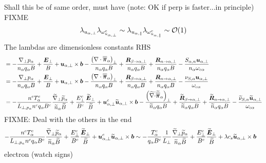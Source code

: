 Shall this be of same order, must have (note: OK if perp is faster...in principle)
FIXME
%
\begin{align*}
 \lambda_{u_{\alpha,\perp}}
 \lambda_{\omega^c_{u_{\alpha,\perp}}}
 \sim
 \lambda_{u_{\alpha,\|}}
 \lambda_{\omega^c_{u_{\alpha,\|}}}
 \sim
 \mathcal{O}(1)
\end{align*}
%
The lambdas are dimensionless constants
%
RHS
%
\begin{align*}
&=
- \frac{ \nabla_\perp p_\alpha }{n_\alpha  q_\alpha B}
+ \frac{\boldsymbol{E}_\perp}{B}
+ \boldsymbol{u}_{\alpha,\perp}\times\boldsymbol{b}
- \frac{ \left(\nabla\cdot\boldsymbol{\overline{\overline{\pi}}}_\alpha\right)_\perp }{n_\alpha  q_\alpha B}
+ \frac{ \boldsymbol{R}_{\beta \to \alpha,\perp} }{n_\alpha q_\alpha B}
+ \frac{ \boldsymbol{R}_{n \to \alpha,\perp} }{n_\alpha q_\alpha B}
- \frac{ S_{\alpha,n}\boldsymbol{u}_{\alpha,\perp} }{n_\alpha \omega_{c\alpha}}
\\
&=
- \frac{ \nabla_\perp p_\alpha }{n_\alpha  q_\alpha B}
+ \frac{\boldsymbol{E}_\perp}{B}
+ \boldsymbol{u}_{\alpha,\perp}\times\boldsymbol{b}
- \frac{ \left(\nabla\cdot\boldsymbol{\overline{\overline{\pi}}}_\alpha\right)_\perp }{n_\alpha  q_\alpha B}
+ \frac{ \boldsymbol{R}_{\beta \to \alpha,\perp} }{n_\alpha q_\alpha B}
+ \frac{ \boldsymbol{R}_{n \to \alpha,\perp} }{n_\alpha q_\alpha B}
- \frac{ \nu_{S,\alpha}\boldsymbol{u}_{\alpha,\perp} }{\omega_{c\alpha}}
\\
&=
- \frac{n^c T^c_\alpha}{L_{\perp, p_\alpha}n^cq_\alpha B^c}
\frac{ \widetilde{ \nabla}_\perp \widetilde{ p}_\alpha }{\widetilde{ n}_\alpha \widetilde{ B}}
+ \frac{E_\perp^c}{B^c}
\frac{\widetilde{ \boldsymbol{E}}_\perp}{\widetilde{ B}}
+ \boldsymbol{u}^c_{\alpha,\perp}
\widetilde{ \boldsymbol{u}}_{\alpha,\perp}\times\boldsymbol{b}
- \frac{ \left(\widetilde{ \nabla\cdot}\widetilde{ \boldsymbol{\overline{\overline{\pi}}}}_\alpha\right)_\perp }{\widetilde{ n}_\alpha  q_\alpha B}
+ \frac{ \widetilde{ \boldsymbol{R}}_{\beta \to \alpha,\perp} }{\widetilde{ n}_\alpha q_\alpha B}
+ \frac{ \widetilde{ \boldsymbol{R}}_{n \to \alpha,\perp} }{\widetilde{ n}_\alpha q_\alpha B}
- \frac{ \widetilde{ \nu}_{S,\alpha}\widetilde{ \boldsymbol{u}}_{\alpha,\perp} }{\omega_{c\alpha}}
\end{align*}
%
FIXME: Deal with the others in the end
%
\begin{align*}
- \frac{n^c T^c_\alpha}{L_{\perp, p_\alpha}n^cq_\alpha B^c}
\frac{ \widetilde{ \nabla}_\perp \widetilde{ p}_\alpha }{\widetilde{ n}_\alpha \widetilde{ B}}
+ \frac{E_\perp^c}{B^c}
\frac{\widetilde{ \boldsymbol{E}}_\perp}{\widetilde{ B}}
+ \boldsymbol{u}^c_{\alpha,\perp}
\widetilde{ \boldsymbol{u}}_{\alpha,\perp}\times\boldsymbol{b}
&\sim
- \frac{T^c_\alpha}{q_\alpha B^c}
\frac{1}{L_{\perp}}
\frac{ \widetilde{ \nabla}_\perp \widetilde{ p}_\alpha }{\widetilde{ n}_\alpha \widetilde{ B}}
+ \frac{E_\perp^c}{B^c}
\frac{\widetilde{ \boldsymbol{E}}_\perp}{\widetilde{ B}}
+ \lambda c_s
\widetilde{ \boldsymbol{u}}_{\alpha,\perp}\times\boldsymbol{b}
\end{align*}
%
electron (watch signs)
%
